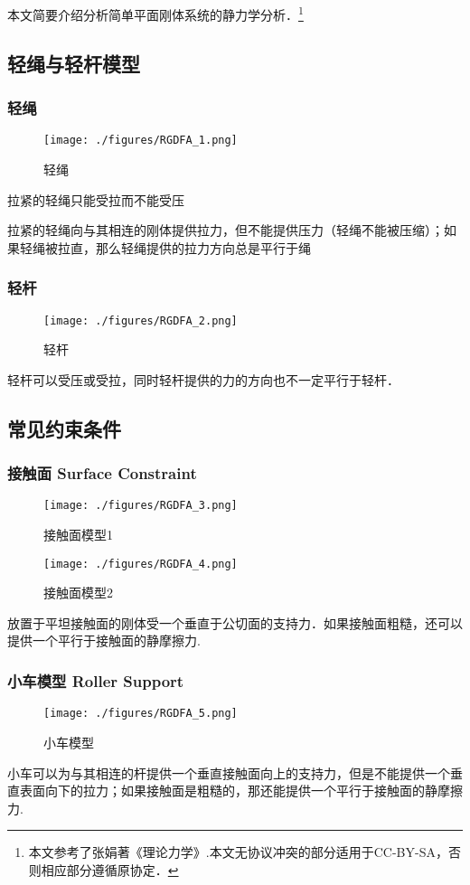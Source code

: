 
本文简要介绍分析简单平面刚体系统的静力学分析．\footnote{本文参考了张娟著《理论力学》.本文无协议冲突的部分适用于CC-BY-SA，否则相应部分遵循原协定．}

\subsection{轻绳与轻杆模型}
\subsubsection{轻绳}
\begin{figure}[ht]
\centering
\texttt{[image: ./figures/RGDFA\_1.png]}
\caption{轻绳} \label{RGDFA_fig1}
\end{figure}
拉紧的轻绳只能受拉而不能受压

拉紧的轻绳向与其相连的刚体提供拉力，但不能提供压力（轻绳不能被压缩）；如果轻绳被拉直，那么轻绳提供的拉力方向总是平行于绳

\subsubsection{轻杆}
\begin{figure}[ht]
\centering
\texttt{[image: ./figures/RGDFA\_2.png]}
\caption{轻杆} \label{RGDFA_fig2}
\end{figure}
轻杆可以受压或受拉，同时轻杆提供的力的方向也不一定平行于轻杆．

\subsection{常见约束条件}
\subsubsection{接触面 Surface Constraint}
\begin{figure}[ht]
\centering
\texttt{[image: ./figures/RGDFA\_3.png]}
\caption{接触面模型1} \label{RGDFA_fig3}
\end{figure}
\begin{figure}[ht]
\centering
\texttt{[image: ./figures/RGDFA\_4.png]}
\caption{接触面模型2} \label{RGDFA_fig4}
\end{figure}
放置于平坦接触面的刚体受一个垂直于公切面的支持力．如果接触面粗糙，还可以提供一个平行于接触面的静摩擦力.
\subsubsection{小车模型 Roller Support}
\begin{figure}[ht]
\centering
\texttt{[image: ./figures/RGDFA\_5.png]}
\caption{小车模型} \label{RGDFA_fig5}
\end{figure}
小车可以为与其相连的杆提供一个垂直接触面向上的支持力，但是不能提供一个垂直表面向下的拉力；如果接触面是粗糙的，那还能提供一个平行于接触面的静摩擦力.
